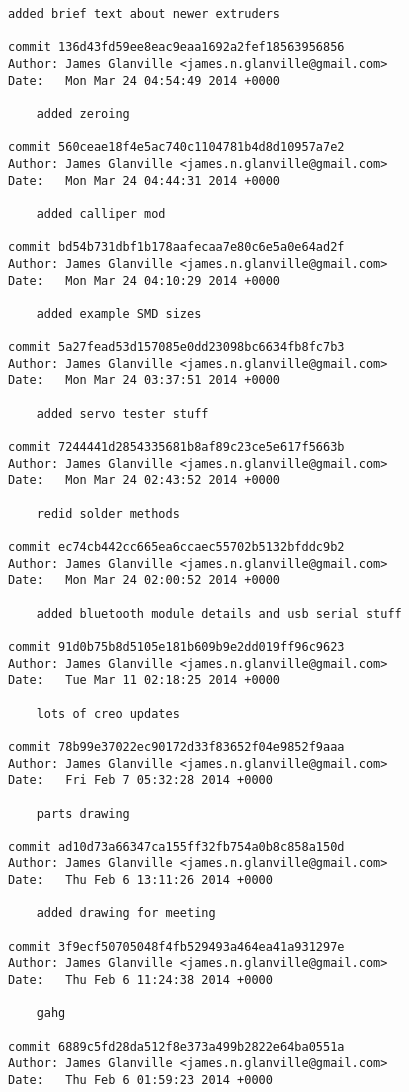 \documentclass[a4paper,11pt]{article}  %
\begin{document}
\begin{lstlisting}[frame=single]
    added brief text about newer extruders

commit 136d43fd59ee8eac9eaa1692a2fef18563956856
Author: James Glanville <james.n.glanville@gmail.com>
Date:   Mon Mar 24 04:54:49 2014 +0000

    added zeroing

commit 560ceae18f4e5ac740c1104781b4d8d10957a7e2
Author: James Glanville <james.n.glanville@gmail.com>
Date:   Mon Mar 24 04:44:31 2014 +0000

    added calliper mod

commit bd54b731dbf1b178aafecaa7e80c6e5a0e64ad2f
Author: James Glanville <james.n.glanville@gmail.com>
Date:   Mon Mar 24 04:10:29 2014 +0000

    added example SMD sizes

commit 5a27fead53d157085e0dd23098bc6634fb8fc7b3
Author: James Glanville <james.n.glanville@gmail.com>
Date:   Mon Mar 24 03:37:51 2014 +0000

    added servo tester stuff

commit 7244441d2854335681b8af89c23ce5e617f5663b
Author: James Glanville <james.n.glanville@gmail.com>
Date:   Mon Mar 24 02:43:52 2014 +0000

    redid solder methods

commit ec74cb442cc665ea6ccaec55702b5132bfddc9b2
Author: James Glanville <james.n.glanville@gmail.com>
Date:   Mon Mar 24 02:00:52 2014 +0000

    added bluetooth module details and usb serial stuff

commit 91d0b75b8d5105e181b609b9e2dd019ff96c9623
Author: James Glanville <james.n.glanville@gmail.com>
Date:   Tue Mar 11 02:18:25 2014 +0000

    lots of creo updates

commit 78b99e37022ec90172d33f83652f04e9852f9aaa
Author: James Glanville <james.n.glanville@gmail.com>
Date:   Fri Feb 7 05:32:28 2014 +0000

    parts drawing

commit ad10d73a66347ca155ff32fb754a0b8c858a150d
Author: James Glanville <james.n.glanville@gmail.com>
Date:   Thu Feb 6 13:11:26 2014 +0000

    added drawing for meeting

commit 3f9ecf50705048f4fb529493a464ea41a931297e
Author: James Glanville <james.n.glanville@gmail.com>
Date:   Thu Feb 6 11:24:38 2014 +0000

    gahg

commit 6889c5fd28da512f8e373a499b2822e64ba0551a
Author: James Glanville <james.n.glanville@gmail.com>
Date:   Thu Feb 6 01:59:23 2014 +0000


\end{lstlisting}
\end{document}
